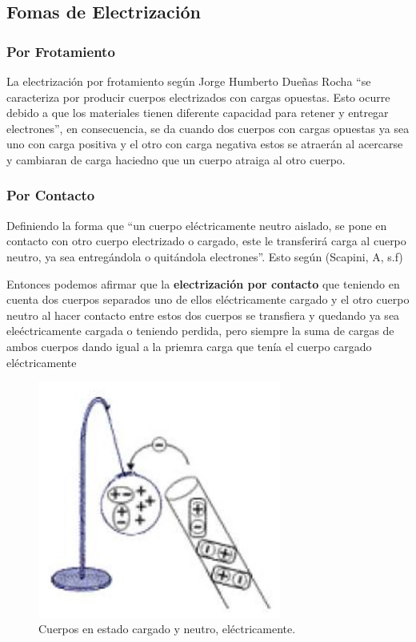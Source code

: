 \subsection{Fomas de Electrización}
\subsubsection{Por Frotamiento}
La electrización por frotamiento según Jorge Humberto Dueñas Rocha ``se
caracteriza por producir cuerpos electrizados con cargas opuestas. Esto ocurre
debido a que los materiales tienen diferente capacidad para retener y entregar
electrones'', en consecuencia, se da cuando dos cuerpos con cargas opuestas ya
sea uno con carga positiva y el otro con carga negativa estos se atraerán al
acercarse y cambiaran de carga haciedno que un cuerpo atraiga al otro cuerpo.
\subsubsection{Por Contacto}
Definiendo la forma que ``un cuerpo eléctricamente neutro aislado, se pone en
contacto con otro cuerpo electrizado o cargado, este le transferirá carga al
cuerpo neutro, ya sea entregándola o quitándola electrones''. Esto según
(Scapini, A, s.f)

Entonces podemos afirmar que la \textbf{electrización por contacto} que
teniendo en cuenta dos cuerpos separados uno de ellos eléctricamente cargado y
el otro cuerpo neutro al hacer contacto entre estos dos cuerpos se transfiera y
quedando ya sea eleéctricamente cargada o teniendo perdida, pero siempre la
suma de cargas de ambos cuerpos dando igual a la priemra carga que tenía el
cuerpo cargado eléctricamente
\begin{figure}[H]
	\centering
	\includegraphics[width=8cm]{Images/img2.jpg}
	\caption{Cuerpos en estado cargado y neutro, eléctricamente.}\label{Fig:fg2}
\end{figure}

